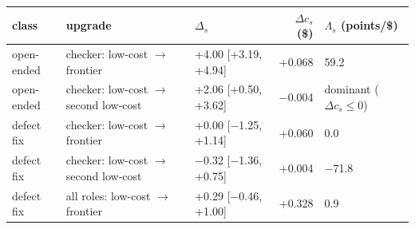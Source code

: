 \begin{tabular}{lllrl}\toprule
class & upgrade & $\Delta_s$ & $\Delta c_s$ (\$) & $\Lambda_s$ (points/\$)\\\midrule
open-ended & checker: low-cost $\to$ frontier & +4.00 [+3.19, +4.94] & +0.068 & 59.2\\
open-ended & checker: low-cost $\to$ second low-cost & +2.06 [+0.50, +3.62] & $-$0.004 & dominant ($\Delta c_s\le0$)\\
defect fix & checker: low-cost $\to$ frontier & +0.00 [$-$1.25, +1.14] & +0.060 & 0.0\\
defect fix & checker: low-cost $\to$ second low-cost & $-$0.32 [$-$1.36, +0.75] & +0.004 & $-$71.8\\
defect fix & all roles: low-cost $\to$ frontier & +0.29 [$-$0.46, +1.00] & +0.328 & 0.9\\
\bottomrule\end{tabular}
